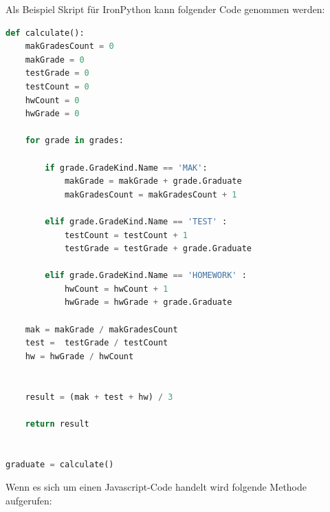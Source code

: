 \newpage
Als Beispiel Skript für IronPython kann folgender Code genommen werden:
\begin{lstlisting}[language={Python},caption=IronPython-Code,label=lst:impl:ipy]
def calculate():
    makGradesCount = 0
    makGrade = 0
    testGrade = 0
    testCount = 0
    hwCount = 0
    hwGrade = 0
    
    for grade in grades:

        if grade.GradeKind.Name == 'MAK':
            makGrade = makGrade + grade.Graduate
            makGradesCount = makGradesCount + 1
        
        elif grade.GradeKind.Name == 'TEST' :
            testCount = testCount + 1
            testGrade = testGrade + grade.Graduate
        
        elif grade.GradeKind.Name == 'HOMEWORK' :
            hwCount = hwCount + 1
            hwGrade = hwGrade + grade.Graduate

    mak = makGrade / makGradesCount
    test =  testGrade / testCount
    hw = hwGrade / hwCount


    result = (mak + test + hw) / 3 

    return result


graduate = calculate()

\end{lstlisting}


\newpage

Wenn es sich um einen Javascript-Code handelt wird folgende Methode aufgerufen:

